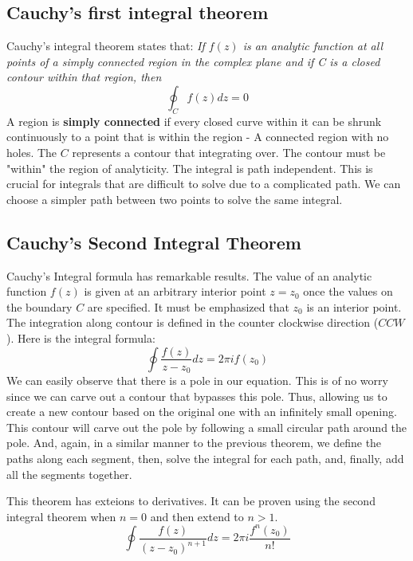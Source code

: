 \documentclass[12pt]{article}
\begin{document}
\subsection{Cauchy's first integral theorem}
Cauchy's integral theorem states that: \textit{If $f(z)$ is an analytic function at all points of a simply connected region in the complex plane and if C is a closed contour within that region, then}
\begin{equation}
    \oint_C f(z)dz=0
\end{equation}
A region is \textbf{simply connected} if every closed curve within it can be shrunk continuously to a point that is within the region - A connected region with no holes. The $C$ represents a contour that integrating over. The contour must be "within" the region of analyticity. The integral is path independent. This is crucial for integrals that are difficult to solve due to a complicated path. We can choose a simpler path between two points to solve the same integral.

\subsection{Cauchy's Second Integral Theorem}
Cauchy's Integral formula has remarkable results. The value of an analytic function $f(z)$ is given at an arbitrary interior point $z=z_{0}$ once the values on the boundary $C$ are specified. It must be emphasized that $z_{0}$ is an interior point. The integration along contour is defined in the counter clockwise direction ($CCW$). Here is the integral formula:
\begin{equation}
    \oint \frac{f(z)}{z-z_{0}}dz = 2\pi if(z_{0})
\end{equation}
We can easily observe that there is a pole in our equation. This is of no worry since we can carve out a contour that bypasses this pole. Thus, allowing us to create a new contour based on the original one with an infinitely small opening. This contour will carve out the pole by following a small circular path around the pole. And, again, in a similar manner to the previous theorem, we define the paths along each segment, then, solve the integral for each path, and, finally, add all the segments together.

This theorem has exteions to derivatives. It can be proven using the second integral theorem when $n=0$ and then extend to $n > 1$.
\begin{equation}
    \oint \frac{f(z)}{(z-z_{0})^{n+1}}dz = 2\pi i \frac{f^{n}(z_{0})}{n!}
\end{equation}
\end{document}
